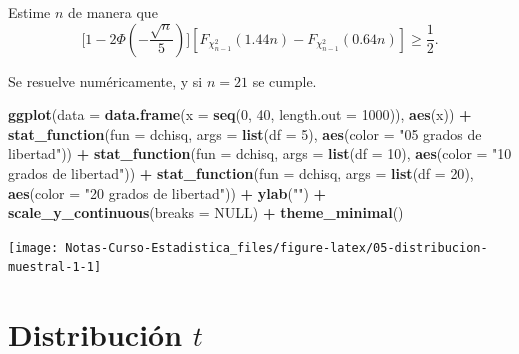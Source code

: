 \documentclass[
  12pt,
]{book}
\newenvironment{Shaded}{\begin{snugshade}}{\end{snugshade}}
\newcommand{\DataTypeTok}[1]{\textcolor[rgb]{0.13,0.29,0.53}{#1}}
\newcommand{\DecValTok}[1]{\textcolor[rgb]{0.00,0.00,0.81}{#1}}
\newcommand{\KeywordTok}[1]{\textcolor[rgb]{0.13,0.29,0.53}{\textbf{#1}}}
\newcommand{\NormalTok}[1]{#1}
\newcommand{\OperatorTok}[1]{\textcolor[rgb]{0.81,0.36,0.00}{\textbf{#1}}}
\newcommand{\OtherTok}[1]{\textcolor[rgb]{0.56,0.35,0.01}{#1}}
\newcommand{\StringTok}[1]{\textcolor[rgb]{0.31,0.60,0.02}{#1}}
\begin{document}
Estime \(n\) de manera que
\[\bigg[1-2\Phi\left(-\dfrac{\sqrt n}{5}\right)\bigg][F_{\chi^2_{n-1}}(1.44n)-F_{\chi^2_{n-1}}(0.64n)] \geq \dfrac 12.\]

Se resuelve numéricamente, y si \(n=21\) se cumple.

\begin{Shaded}
\begin{Highlighting}[]
\KeywordTok{ggplot}\NormalTok{(}\DataTypeTok{data =} \KeywordTok{data.frame}\NormalTok{(}\DataTypeTok{x =} \KeywordTok{seq}\NormalTok{(}\DecValTok{0}\NormalTok{, }\DecValTok{40}\NormalTok{, }\DataTypeTok{length.out =} \DecValTok{1000}\NormalTok{)), }\KeywordTok{aes}\NormalTok{(x)) }\OperatorTok{+}
\StringTok{  }\KeywordTok{stat\_function}\NormalTok{(}\DataTypeTok{fun =}\NormalTok{ dchisq, }\DataTypeTok{args =} \KeywordTok{list}\NormalTok{(}\DataTypeTok{df =} \DecValTok{5}\NormalTok{), }\KeywordTok{aes}\NormalTok{(}\DataTypeTok{color =} \StringTok{"05 grados de libertad"}\NormalTok{)) }\OperatorTok{+}
\StringTok{  }\KeywordTok{stat\_function}\NormalTok{(}\DataTypeTok{fun =}\NormalTok{ dchisq, }\DataTypeTok{args =} \KeywordTok{list}\NormalTok{(}\DataTypeTok{df =} \DecValTok{10}\NormalTok{), }\KeywordTok{aes}\NormalTok{(}\DataTypeTok{color =} \StringTok{"10 grados de libertad"}\NormalTok{)) }\OperatorTok{+}
\StringTok{  }\KeywordTok{stat\_function}\NormalTok{(}\DataTypeTok{fun =}\NormalTok{ dchisq, }\DataTypeTok{args =} \KeywordTok{list}\NormalTok{(}\DataTypeTok{df =} \DecValTok{20}\NormalTok{), }\KeywordTok{aes}\NormalTok{(}\DataTypeTok{color =} \StringTok{"20 grados de libertad"}\NormalTok{)) }\OperatorTok{+}
\StringTok{  }\KeywordTok{ylab}\NormalTok{(}\StringTok{""}\NormalTok{) }\OperatorTok{+}
\StringTok{  }\KeywordTok{scale\_y\_continuous}\NormalTok{(}\DataTypeTok{breaks =} \OtherTok{NULL}\NormalTok{) }\OperatorTok{+}
\StringTok{  }\KeywordTok{theme\_minimal}\NormalTok{()}
\end{Highlighting}
\end{Shaded}

\begin{center}\texttt{[image: Notas-Curso-Estadistica\_files/figure-latex/05-distribucion-muestral-1-1]} \end{center}

\hypertarget{distribuciuxf3n-t}{%
\section{\texorpdfstring{Distribución \(t\)}{Distribución t}}\label{distribuciuxf3n-t}}
\end{document}

